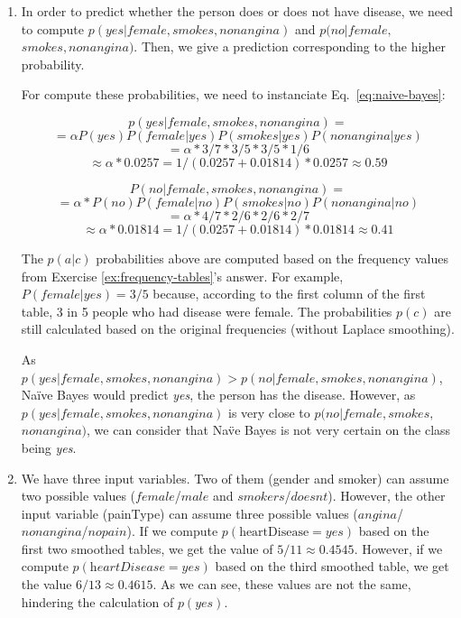\begin{enumerate}
\item  In order to predict whether the person does or does not have disease, we need to compute $p(yes|female,smokes,nonangina)$ and $p(no|female,$ $smokes,nonangina)$. Then, we give a prediction corresponding to the higher probability.

For compute these probabilities, we need to instanciate Eq.~\ref{eq:naive-bayes}:

\[p(yes|female,smokes,nonangina) =\]
\[= \alpha P(yes) P(female|yes) P(smokes|yes) P(nonangina|yes)\]
\[= \alpha * 3/7 * 3/5 * 3/5 * 1/6\]
\[\approx \alpha * 0.0257 = 1 / (0.0257 + 0.01814) * 0.0257 \approx 0.59\]

\[P(no|female,smokes,nonangina) =\]
\[= \alpha * P(no) P(female|no) P(smokes|no) P(nonangina|no)\]
\[= \alpha * 4/7 * 2/6 * 2/6 * 2/7\]
\[\approx \alpha * 0.01814 = 1 / (0.0257 + 0.01814) * 0.01814 \approx 0.41\]

The $p(a|c)$ probabilities above are computed based on the frequency values from Exercise \ref{ex:frequency-tables}’s answer. For example, $P(female|yes) = 3/5$ because, according to the first column of the first table, 3 in 5 people who had disease were female. The probabilities $p(c)$ are still calculated based on the original frequencies (without Laplace smoothing).

As $p(yes|female,smokes,nonangina) > p(no|female,smokes,nonangina)$, Na\"ive Bayes would predict \textit{yes}, the person has the disease. However, as $p(yes|female,smokes,nonangina)$ is very close to $p(no|female,smokes,$ $nonangina)$, we can consider that Na\"ve Bayes is not very certain on the class being \textit{yes}.

\item We have three input variables. Two of them (gender and smoker) can assume two possible values ($female$/$male$ and $smokers$/$doesnt$). However, the other input variable (painType) can assume three possible values ($angina$/$nonangina$/$nopain$). If we compute $p(\text{heartDisease}=yes)$ based on the first two smoothed tables, we get the value of $5/11 \approx 0.4545$. However, if we compute $p(\textit{heartDisease}=yes)$ based on the third smoothed table, we get the value $6/13 \approx 0.4615$. As we can see, these values are not the same, hindering the calculation of $p(yes)$.

\end{enumerate}







